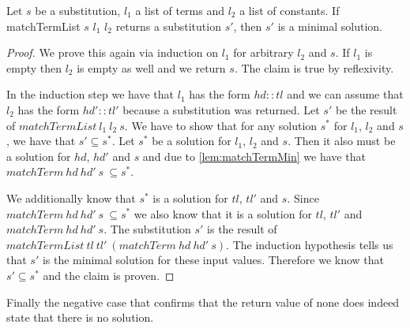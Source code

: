 \begin{lemma}[\matchTermListFindsMinimalSolution]
    Let $s$ be a substitution, $l_1$ a list of terms and $l_2$ a list of constants. If matchTermList $s$ $l_1$ $l_2$ returns a substitution $s'$, then $s'$ is a minimal solution.
\end{lemma}
\begin{proof}
    We prove this again via induction on $l_1$ for arbitrary $l_2$ and $s$. If $l_1$ is empty then $l_2$ is empty as well and we return $s$. The claim is true by reflexivity.

    In the induction step we have that $l_1$ has the form $hd::tl$ and we can assume that $l_2$ has the form $hd'::tl'$ because a substitution was returned. Let $s'$ be the result of $matchTermList\ l_1\ l_2\ s$. We have to show that for any solution $s^\ast$ for $l_1$, $l_2$ and $s$, we have that $s' \subseteq s^\ast$.
    Let $s^\ast$ be a solution for $l_1$, $l_2$ and $s$. Then it also must be a solution for $hd$, $hd'$ and $s$ and due to \cref{lem:matchTermMin} we have that $matchTerm\ hd\ hd'\ s\ \subseteq s^\ast$. 

    We additionally know that $s^\ast$ is a solution for $tl$, $tl'$ and $s$. Since $matchTerm\ hd\ hd'\ s\ \subseteq s^\ast$ we also know that it is a solution for $tl$, $tl'$ and $matchTerm\ hd\ hd'\ s$.  The substitution $s'$ is the result of $matchTermList\ tl\ tl'\ (matchTerm\ hd\ hd'\ s)$. The induction hypothesis tells us that $s'$ is the minimal solution for these input values. Therefore we know that $s' \subseteq s^\ast$ and the claim is proven. 
    
\end{proof}

Finally the negative case that confirms that the return value of none does indeed state that there is no solution.

